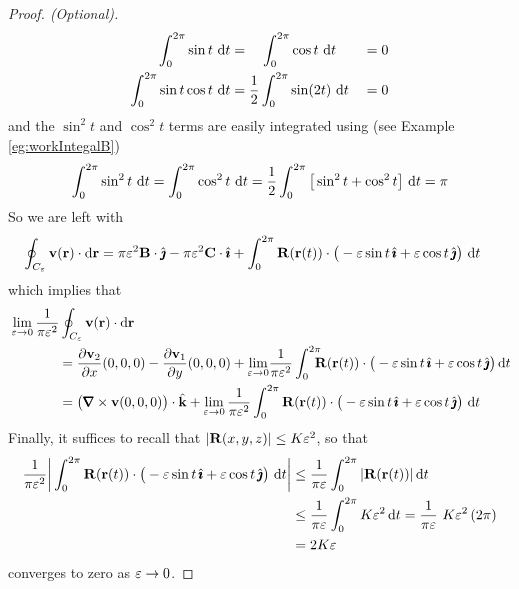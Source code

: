 \begin{proof}[Proof. (Optional)]
\begin{alignat*}{3}
\int_0^{2\pi}\sin t\ \mathrm{d}t
   &=\hskip10pt\int_0^{2\pi}\cos t\ \mathrm{d}t
   &&=0 \\
\int_0^{2\pi}\sin t\cos t\ \mathrm{d}t 
&= \frac{1}{2}\int_0^{2\pi}\sin(2t)\ \mathrm{d}t
&&=0
\end{alignat*}
and the $\sin^2t$ and $\cos^2 t$ terms are easily integrated using
(see Example \ref{eg:workIntegalB})
\begin{equation*}
\int_0^{2\pi}\sin^2 t\ \dee{t}=\int_0^{2\pi}\cos^2 t\ \dee{t}
=\frac{1}{2}\int_0^{2\pi}\big[\sin^2t+\cos^2 t\big]\ \dee{t}=\pi
\end{equation*}
So we are left with
\begin{align*}
\oint_{C_\varepsilon} \mathbf{v}(\mathbf{r})\cdot \mathrm{d}\mathbf{r} 
&= \pi\varepsilon^2\mathbf{B}\cdot\hat{\pmb{\jmath}} - \pi\varepsilon^2\mathbf{C}\cdot\hat{\pmb{\imath}}
+\int_0^{2\pi} \mathbf{R}(\mathbf{r}(t))
        \cdot \big(-\varepsilon\sin t\,\hat{\pmb{\imath}} +\varepsilon\cos t\,\hat{\pmb{\jmath}}\big)\ \mathrm{d}t
\end{align*}
which implies that
\begin{align*}
&\lim_{\veps\rightarrow 0}\frac{1}{\pi\veps^2}
         \oint_{C_\veps} \vv(\vr)\cdot \dee{\vr} \\
&\hskip0.5in= \frac{\partial \vv_2}{\partial x}(0,0,0) 
  - \frac{\partial \vv_1}{\partial y}(0,0,0)
   +\lim_{\veps\rightarrow 0}\!
     \frac{1}{\pi\veps^2}
           \int_0^{2\pi}\!\!\!\! \vR(\vr(t))
        \cdot \big(-\veps\sin t\,\hi +\veps\cos t\,\hj\big)\,\dee{t} \\
&\hskip0.5in= \big(\vnabla\times\vv(0,0,0)\big)\cdot\hk
   +\lim_{\veps\rightarrow 0}
     \frac{1}{\pi\veps^2}
           \int_0^{2\pi} \vR(\vr(t))
        \cdot \big(-\veps\sin t\,\hi +\veps\cos t\,\hj\big)\ \dee{t}
\end{align*}
Finally, it suffices to recall that
$|\mathbf{R}(x,y,z)|\le K\varepsilon^2$, so that
\begin{align*}
\frac{1}{\pi\varepsilon^2}\bigg|
            \int_0^{2\pi} \mathbf{R}(\mathbf{r}(t))
        \cdot \big(-\varepsilon\sin t\,\hat{\pmb{\imath}} +\varepsilon\cos t\,\hat{\pmb{\jmath}}\big)\ \mathrm{d}t \bigg|
&\le \frac{1}{\pi\varepsilon}
            \int_0^{2\pi}|\mathbf{R}(\mathbf{r}(t))|\,\mathrm{d}t  \\
&\le \frac{1}{\pi\varepsilon}
           \int_0^{2\pi}K\varepsilon^2\,\mathrm{d}t 
= \frac{1}{\pi\varepsilon} \ K\varepsilon^2\,(2\pi) \\
&= 2K\varepsilon
\end{align*}
converges to zero as $\varepsilon\rightarrow 0$.

\end{proof}
